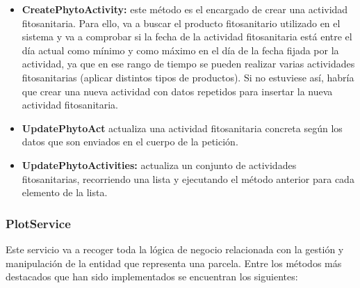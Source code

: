 \begin{itemize}
    \item \textbf{CreatePhytoActivity:} este método es el encargado de crear una actividad fitosanitaria. Para ello, va a buscar el producto fitosanitario utilizado en el sistema y va a comprobar si la fecha de la actividad
    fitosanitaria está entre el día actual como mínimo y como máximo en el día de la fecha fijada por la actividad, ya que en ese rango de tiempo se pueden realizar varias actividades fitosanitarias (aplicar distintos tipos de 
    productos). Si no estuviese así, habría que crear una nueva actividad con datos repetidos para insertar la nueva actividad fitosanitaria.

    \item \textbf{UpdatePhytoAct} actualiza una actividad fitosanitaria concreta según los datos que son enviados en el cuerpo de la petición.
    
    \item \textbf{UpdatePhytoActivities:} actualiza un conjunto de actividades fitosanitarias, recorriendo una lista y ejecutando el método anterior para cada elemento de la lista.
\end{itemize}

\subsubsection{PlotService}

Este servicio va a recoger toda la lógica de negocio relacionada con la gestión y manipulación de la entidad que representa una parcela. Entre los métodos más destacados que han sido
implementados se encuentran los siguientes:

